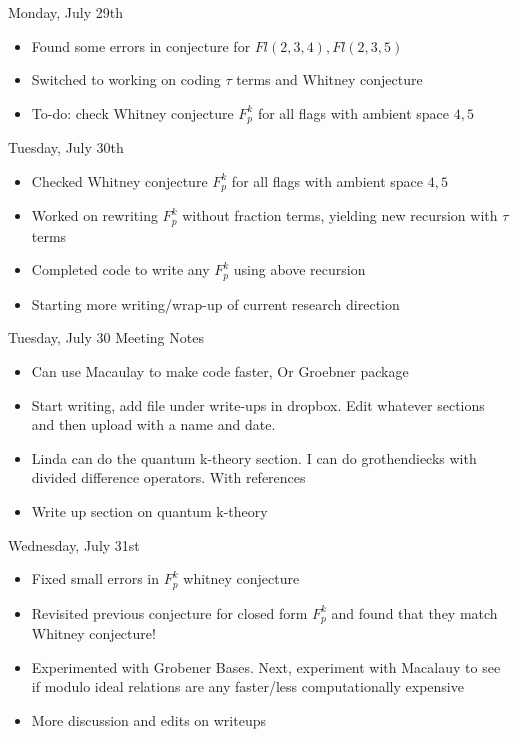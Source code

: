 Monday, July 29th
\begin{itemize}
    \item Found some errors in conjecture for $Fl(2, 3, 4), Fl(2, 3, 5)$
    \item Switched to working on coding $\tau$ terms and Whitney conjecture
    \item To-do: check Whitney conjecture $F_p^k$ for all flags with ambient space $4, 5$
\end{itemize}

Tuesday, July 30th
\begin{itemize}
    \item Checked Whitney conjecture $F_p^k$ for all flags with ambient space $4, 5$
    \item Worked on rewriting $F_p^k$ without fraction terms, yielding new recursion with $\tau$ terms
    \item Completed code to write any $F_p^k$ using above recursion
    \item Starting more writing/wrap-up of current research direction
\end{itemize}

Tuesday, July 30 Meeting Notes
\begin{itemize}
    \item Can use Macaulay to make code faster, Or Groebner package
    \item Start writing, add file under write-ups in dropbox. Edit whatever sections and then upload with a name and date. 
    \item Linda can do the quantum k-theory section. I can do grothendiecks with divided difference operators. With references
    \item Write up section on quantum k-theory 
\end{itemize}

Wednesday, July 31st
\begin{itemize}
    \item Fixed small errors in $F_p^k$ whitney conjecture
    \item Revisited previous conjecture for closed form $F_p^k$ and found that they match Whitney conjecture!
    \item Experimented with Grobener Bases. Next, experiment with Macalauy to see if modulo ideal relations are any faster/less computationally expensive
    \item More discussion and edits on writeups
\end{itemize}


